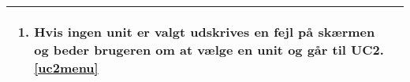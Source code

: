 \begin{table}[H]
\begin{tabular} {|p{6cm}|p{8cm}|}
		\begin{enumerate}[label= \ref{uc2sysact}a.]
			\item Hvis ingen unit er valgt udskrives en fejl på skærmen og beder brugeren om at vælge en unit og går til UC2.\ref{uc2menu}
		\end{enumerate} \\\hline
											

	\end{tabular}
	\label{UC2} 
\end{table}